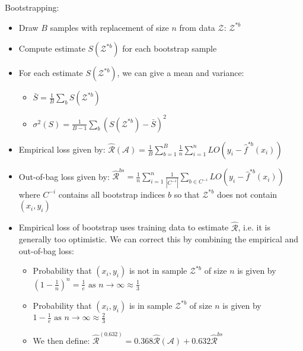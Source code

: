 Bootstrapping:
\begin{itemize}
    \item Draw $B$ samples with replacement of size $n$ from data $\mathcal{Z}$: $\mathcal{Z}^{*b}$
    \item Compute estimate $S( \mathcal{Z}^{*b} )$ for each bootstrap sample
    \item For each estimate $S( \mathcal{Z}^{*b} )$, we can give a mean and variance:
    \begin{itemize}
        \item $\bar{S} = \frac{1}{B} \sum_b S( \mathcal{Z}^{*b} )$
        \item $\sigma^2(S) = \frac{1}{B-1} \sum_b ( S( \mathcal{Z}^{*b} ) - \bar{S})^2$
    \end{itemize}
    \item Empirical loss given by: $\hat{\mathcal{R}}(\mathcal{A}) = \frac{1}{B} \sum_{b=1}^B \frac{1}{n} \sum_{i=1}^n LO(y_i - \hat{f}^{*b} (x_i))$ 
    \item Out-of-bag loss given by: $\hat{\mathcal{R}}^{bs} = \frac{1}{n} \sum_{i=1}^n \frac{1}{| C^{-i} |} \sum_{b \in C^{-i}} LO(y_i - \hat{f}^{*b} (x_i))$ where $C^{-i}$ contains all bootstrap indices $b$ so that $\mathcal{Z}^{*b}$ does not contain $(x_i,y_i)$
    \item Empirical loss of bootstrap uses training data to estimate $\hat{\mathcal{R}}$, i.e. it is generally too optimistic. We can correct this by combining the empirical and out-of-bag loss:
    \begin{itemize}
        \item Probability that $(x_i,y_i)$ is not in sample $\mathcal{Z}^{*b}$ of size $n$ is given by $(1-\frac{1}{n})^n = \frac{1}{e} \textrm{ as } n \rightarrow \infty \approx \frac{1}{3}$
        \item Probability that $(x_i,y_i)$ is in sample $\mathcal{Z}^{*b}$ of size $n$ is given by $1 - \frac{1}{e} \textrm{ as } n \rightarrow \infty \approx \frac{2}{3}$
        \item We then define: $\hat{\mathcal{R}}^{(0.632)} = 0.368 \hat{\mathcal{R}}(\mathcal{A}) + 0.632 \hat{\mathcal{R}}^{bs}$
    \end{itemize}
\end{itemize}